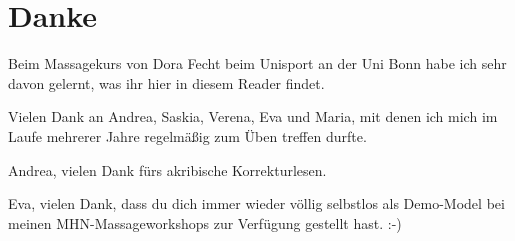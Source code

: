 \section*{Danke}

Beim Massagekurs von Dora Fecht beim Unisport an der Uni Bonn habe ich sehr davon gelernt, was ihr hier in diesem Reader findet.

Vielen Dank an Andrea, Saskia, Verena, Eva und Maria, mit denen ich mich im Laufe mehrerer Jahre regelmäßig zum Üben treffen durfte.

Andrea, vielen Dank fürs akribische Korrekturlesen.

Eva, vielen Dank, dass du dich immer wieder völlig selbstlos als Demo-Model bei meinen MHN-Massageworkshops zur Verfügung gestellt hast. :-)
